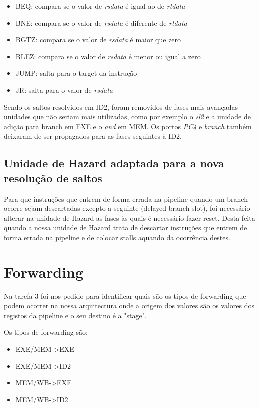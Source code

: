 \documentclass[pdftex,12pt,a4paper]{report}
\begin{document}
\begin{itemize}
\item BEQ: compara se o valor de \textit{rsdata} é igual ao de \textit{rtdata}
\item BNE: compara se o valor de \textit{rsdata} é diferente de \textit{rtdata} 
\item BGTZ: compara se o valor de \textit{rsdata} é maior que zero
\item BLEZ: compara se o valor de \textit{rsdata} é menor ou igual a zero
\item JUMP: salta para o target da instrução
\item JR: salta para o valor de \textit{rsdata}
\end{itemize} 

Sendo os saltos resolvidos em ID2, foram removidos de fases mais avançadas unidades que não seriam mais utilizadas, como por exemplo o \textit{sl2} e a unidade de adição para branch em EXE e o \textit{and} em MEM. Os portos \textit{PC4} e \textit{branch} também deixaram de ser propagados para as fases seguintes à ID2.

\subsection{Unidade de Hazard adaptada para a nova resolução de saltos}

Para que instruções que entrem de forma errada na pipeline quando um branch ocorre sejam descartadas excepto a seguinte (delayed branch slot), foi necessário alterar na unidade de Hazard as fases às quais é necessário fazer reset. Desta feita quando a nossa unidade de Hazard trata de descartar instruções que entrem de forma errada na pipeline e de colocar stalls aquando da ocorrência destes.

\section{Forwarding}

Na tarefa 3 foi-nos pedido para identificar quais são os tipos de forwarding que podem ocorrer na nossa arquitectura onde a origem dos valores são os valores dos registos da pipeline e o seu destino é a "stage".

Os tipos de forwarding são:
\begin{itemize}
\item EXE/MEM->EXE
\item EXE/MEM->ID2
\item MEM/WB->EXE
\item MEM/WB->ID2
\end{itemize} 
\end{document}
